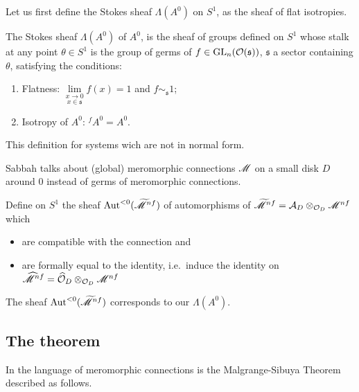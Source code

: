 Let us first define the Stokes sheaf $\Lambda(A^0)$ on $S^1$, as the sheaf of
flat isotropies.
\begin{defn}\label{defn:StokesSheaf}
  The Stokes sheaf $\Lambda(A^0)$ of $A^0$, is the sheaf of groups defined on
  $S^1$ whose stalk at any point $\theta\in S^1$ is the group of germs of
  $f\in\operatorname{GL}_n(\mathcal{O}(\mathfrak{s}))$, $\mathfrak{s}$ a sector containing $\theta$,
  satisfying
  the conditions:
  \begin{enumerate}
    \item Flatness: $\underset{x\in\mathfrak{s}}{\underset{x\to0}{\lim}}f(x)=1$
      and $f\sim_{\mathfrak{s}} 1$;
    \item Isotropy of $A^0$: ${}^f\!A^0=A^0$.
  \end{enumerate}
  \begin{s-rem}
    This definition  for systems wich are not in
    normal form.
  \end{s-rem}
  \begin{s-rem}
    Sabbah \cite[110]{sabbah2007isomonodromic} talks about (global) meromorphic
    connections $\mathscr{M}$ on a small disk $D$ around $0$ instead of germs of
    meromorphic connections.

    Define on $S^1$ the sheaf $\operatorname{Aut}^{<0}(\widetilde{\mathscr{M}}^{nf})$ of automorphisms of
    $\widetilde{\mathscr{M}}^{nf}=\mathcal{A}_D\otimes_{\mathcal{O}_D}\mathscr{M}^{nf}$ which
    \begin{itemize}
      \item are compatible with the connection and
      \item are formally equal to the identity, i.e.\ induce the identity on
        $\widehat{\mathscr{M}}^{nf}=\widehat{\mathcal{O}}_D\otimes_{\mathcal{O}_D}\mathscr{M}^{nf}$
    \end{itemize}

    The sheaf $\operatorname{Aut}^{<0}(\widetilde{\mathscr{M}}^{nf})$ corresponds to our $\Lambda(A^0)$.
  \end{s-rem}
\end{defn}

\subsection{The theorem}
In the language of meromorphic connections is the Malgrange-Sibuya Theorem
described as follows.

